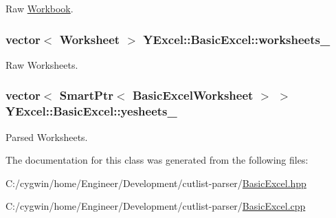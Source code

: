 Raw \hyperlink{class_y_excel_1_1_workbook}{Workbook}. 

\hypertarget{class_y_excel_1_1_basic_excel_a3f84f1e11e796766f76c7c5f7fa3fb38}{}
\subsubsection[{worksheets\+\_\+}]{\setlength{\rightskip}{0pt plus 5cm}vector$<$ {\bf Worksheet} $>$ Y\+Excel\+::\+Basic\+Excel\+::worksheets\+\_\+}\label{class_y_excel_1_1_basic_excel_a3f84f1e11e796766f76c7c5f7fa3fb38}


Raw Worksheets. 

\hypertarget{class_y_excel_1_1_basic_excel_a95d0514fb313723138622f324f2a59f9}{}
\subsubsection[{yesheets\+\_\+}]{\setlength{\rightskip}{0pt plus 5cm}vector$<$ {\bf Smart\+Ptr}$<$ {\bf Basic\+Excel\+Worksheet} $>$ $>$ Y\+Excel\+::\+Basic\+Excel\+::yesheets\+\_\+}\label{class_y_excel_1_1_basic_excel_a95d0514fb313723138622f324f2a59f9}


Parsed Worksheets. 



The documentation for this class was generated from the following files\+:\begin{DoxyCompactItemize}
\item 
C\+:/cygwin/home/\+Engineer/\+Development/cutlist-\/parser/\hyperlink{_basic_excel_8hpp}{Basic\+Excel.\+hpp}\item 
C\+:/cygwin/home/\+Engineer/\+Development/cutlist-\/parser/\hyperlink{_basic_excel_8cpp}{Basic\+Excel.\+cpp}\end{DoxyCompactItemize}
